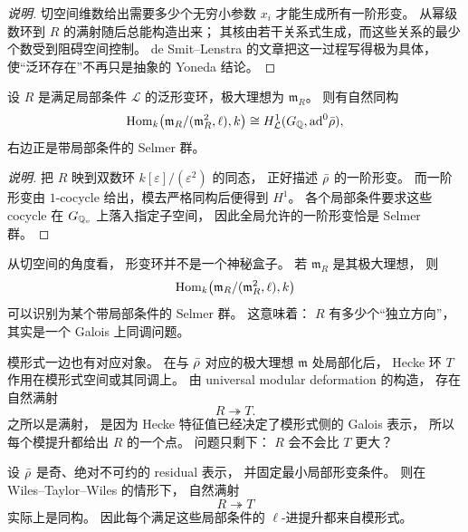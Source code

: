 \begin{proof}[说明]
切空间维数给出需要多少个无穷小参数 $x_i$ 才能生成所有一阶形变。
从幂级数环到 $R$ 的满射随后总能构造出来；
其核由若干关系式生成，而这些关系的最少个数受到阻碍空间控制。
de Smit--Lenstra 的文章把这一过程写得极为具体，
使“泛环存在”不再只是抽象的 Yoneda 结论。
\end{proof}

\begin{proposition}
\label{prop:ch10-tangent-selmer}
设 $R$ 是满足局部条件 $\mathcal L$ 的泛形变环，极大理想为 $\mathfrak m_R$。
则有自然同构
\[
  \mathrm{Hom}_k\bigl(\mathfrak m_R/(\mathfrak m_R^2,\ell),k\bigr)
  \cong
  H^1_{\mathcal L}(G_{\mathbb{Q}},\mathrm{ad}^0\bar{\rho}),
\]
右边正是带局部条件的 Selmer 群。
\end{proposition}

\begin{proof}[说明]
把 $R$ 映到双数环 $k[\varepsilon]/(\varepsilon^2)$ 的同态，
正好描述 $\bar{\rho}$ 的一阶形变。
而一阶形变由 $1$-cocycle 给出，模去严格同构后便得到 $H^1$。
各个局部条件要求这些 cocycle 在 $G_{\mathbb{Q}_v}$ 上落入指定子空间，
因此全局允许的一阶形变恰是 Selmer 群。
\end{proof}

从切空间的角度看，
形变环并不是一个神秘盒子。
若 $\mathfrak m_R$ 是其极大理想，
则
\[
  \mathrm{Hom}_k\bigl(\mathfrak m_R/(\mathfrak m_R^2,\ell),k\bigr)
\]
可以识别为某个带局部条件的 Selmer 群。
这意味着：
$R$ 有多少个“独立方向”，
其实是一个 Galois 上同调问题。

模形式一边也有对应对象。
在与 $\bar{\rho}$ 对应的极大理想 $\mathfrak m$ 处局部化后，
Hecke 环 $T$ 作用在模形式空间或其同调上。
由 universal modular deformation 的构造，
存在自然满射
\[
  R\twoheadrightarrow T.
\]
之所以是满射，
是因为 Hecke 特征值已经决定了模形式侧的 Galois 表示，
所以每个模提升都给出 $R$ 的一个点。
问题只剩下：
$R$ 会不会比 $T$ 更大？

\begin{theorem}[Wiles 的 $R=T$ 定理，简化表述]
\label{thm:ch10-rt}
设 $\bar{\rho}$ 是奇、绝对不可约的 residual 表示，
并固定最小局部形变条件。
则在 Wiles--Taylor--Wiles 的情形下，
自然满射
\[
  R\twoheadrightarrow T
\]
实际上是同构。
因此每个满足这些局部条件的 $\ell$-进提升都来自模形式。
\end{theorem}

